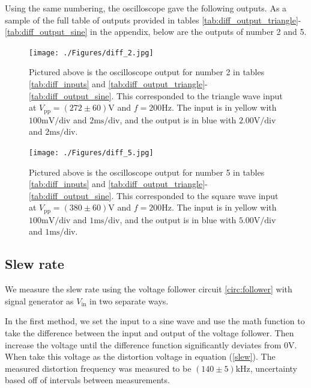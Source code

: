 \documentclass[11pt]{article}
\begin{document}
Using the same numbering, the oscilloscope gave the following outputs.
As a sample of the full table of outputs provided in tables 
\ref{tab:diff_output_triangle}-\ref{tab:diff_output_sine}
in the appendix, below are the outputs of number 2 and 5.

\begin{minipage}{0.45\textwidth}
	\begin{figure}[H]
		\centering
		\texttt{[image: ./Figures/diff\_2.jpg]}
		\caption{
			Pictured above is the oscilloscope output for number 2 in tables
			\ref{tab:diff_inputs} and 
			\ref{tab:diff_output_triangle}-\ref{tab:diff_output_sine}.
			This corresponded
			to the triangle wave input at $V_\text{pp}=(272 \pm 60) \si{\volt}$ 
			and $f=200 \si{\hertz}$. 
			The input is in yellow with 
			$100 \si{\milli\volt}/\text{div}$ and 
			$2 \si{\milli\second}/\text{div}$, and 
			the output is in blue with 
			$2.00 \si{\volt}/\text{div}$ and 
			$2 \si{\milli\second}/\text{div}$. 
		}
	\end{figure}
\end{minipage}
\hspace{0.1\textwidth}
\begin{minipage}{0.45\textwidth}
	\begin{figure}[H]
		\centering
		\texttt{[image: ./Figures/diff\_5.jpg]}
		\caption{
			Pictured above is the oscilloscope output for number 5 in tables
			\ref{tab:diff_inputs} and
			\ref{tab:diff_output_triangle}-\ref{tab:diff_output_sine}.
			This corresponded
			to the square wave input at $V_\text{pp}=(380 \pm 60) \si{\volt}$ 
			and $f=200 \si{\hertz}$. 
			The input is in yellow with
			$100 \si{\milli\volt}/\text{div}$ and 
			$1 \si{\milli\second}/\text{div}$, and 
			the output is in blue with 
			$5.00 \si{\volt}/\text{div}$ and 
			$1 \si{\milli\second}/\text{div}$. 
		}
	\end{figure}
\end{minipage}

\subsection{Slew rate}

We measure the slew rate using the voltage follower circuit \ref{circ:follower}
with signal generator as $V_\text{in}$ in two separate ways. 

In the first method, we set the input to a sine wave and use the math function
to take the difference between the input and output of the voltage follower. 
Then increase the voltage until the difference function significantly deviates
from $0 \si{\volt}$. When take this voltage as the distortion voltage in
equation (\ref{slew}). The measured distortion frequency was measured to be
$(140 \pm 5) \si{\kilo\hertz}$, uncertainty based off of intervals between 
measurements.
\end{document}
